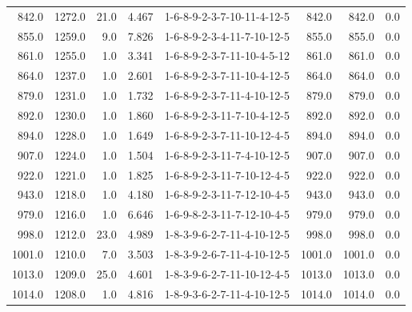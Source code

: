 \begin{tabular}{rrrrlrrr}
  842.0 &  1272.0 &           21.0 &              4.467 &  1-6-8-9-2-3-7-10-11-4-12-5 &         842.0 &           842.0 &       0.0 \\
  855.0 &  1259.0 &            9.0 &              7.826 &  1-6-8-9-2-3-4-11-7-10-12-5 &         855.0 &           855.0 &       0.0 \\
  861.0 &  1255.0 &            1.0 &              3.341 &  1-6-8-9-2-3-7-11-10-4-5-12 &         861.0 &           861.0 &       0.0 \\
  864.0 &  1237.0 &            1.0 &              2.601 &  1-6-8-9-2-3-7-11-10-4-12-5 &         864.0 &           864.0 &       0.0 \\
  879.0 &  1231.0 &            1.0 &              1.732 &  1-6-8-9-2-3-7-11-4-10-12-5 &         879.0 &           879.0 &       0.0 \\
  892.0 &  1230.0 &            1.0 &              1.860 &  1-6-8-9-2-3-11-7-10-4-12-5 &         892.0 &           892.0 &       0.0 \\
  894.0 &  1228.0 &            1.0 &              1.649 &  1-6-8-9-2-3-7-11-10-12-4-5 &         894.0 &           894.0 &       0.0 \\
  907.0 &  1224.0 &            1.0 &              1.504 &  1-6-8-9-2-3-11-7-4-10-12-5 &         907.0 &           907.0 &       0.0 \\
  922.0 &  1221.0 &            1.0 &              1.825 &  1-6-8-9-2-3-11-7-10-12-4-5 &         922.0 &           922.0 &       0.0 \\
  943.0 &  1218.0 &            1.0 &              4.180 &  1-6-8-9-2-3-11-7-12-10-4-5 &         943.0 &           943.0 &       0.0 \\
  979.0 &  1216.0 &            1.0 &              6.646 &  1-6-9-8-2-3-11-7-12-10-4-5 &         979.0 &           979.0 &       0.0 \\
  998.0 &  1212.0 &           23.0 &              4.989 &  1-8-3-9-6-2-7-11-4-10-12-5 &         998.0 &           998.0 &       0.0 \\
 1001.0 &  1210.0 &            7.0 &              3.503 &  1-8-3-9-2-6-7-11-4-10-12-5 &        1001.0 &          1001.0 &       0.0 \\
 1013.0 &  1209.0 &           25.0 &              4.601 &  1-8-3-9-6-2-7-11-10-12-4-5 &        1013.0 &          1013.0 &       0.0 \\
 1014.0 &  1208.0 &            1.0 &              4.816 &  1-8-9-3-6-2-7-11-4-10-12-5 &        1014.0 &          1014.0 &       0.0 \\

\end{tabular}
